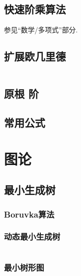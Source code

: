 \documentclass[a4paper, twoside]{article}
\begin{document}
\begin{multicols}{2}
			\subsection{快速阶乘算法}
				参见``数学/多项式''部分.



			\subsection{扩展欧几里德}
				\inputminted{cpp}{../src/numbertheory/exgcd.cpp}
				
			
			\subsection{原根 阶}
				
			
			\subsection{常用公式}
				
				

		\section{图论}

			\subsection{最小生成树}
				\subsubsection{Boruvka算法}
					
				
				\subsubsection{动态最小生成树}
					\inputminted{cpp}{../src/graph/动态最小生成树.cpp}
				
				\subsubsection{最小树形图}
					
				

\end{multicols}
\end{document}
